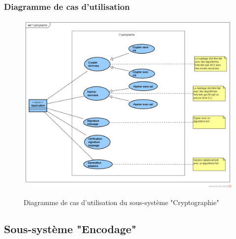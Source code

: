 \subsubsection{Diagramme de cas d'utilisation}
\begin{figure}[H]
	\centering
	\begin{minipage}{12cm}
		\centering
		{\includegraphics[height=0.35\textheight, width=1\textwidth]{fig/Cryptographie-use-case-diagram.png}}
	\end{minipage}
	\caption{Diagramme de cas d'utilisation du sous-système "Cryptographie"}
	\label{fig:7.14}
\end{figure}

\subsection{Sous-système "Encodage"}
